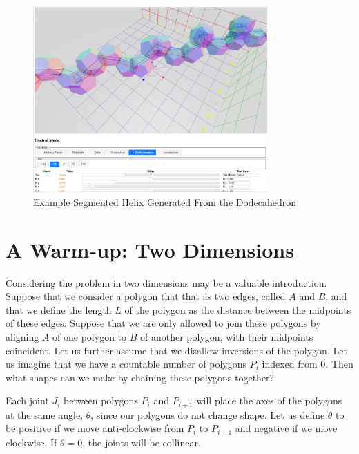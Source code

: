 \documentclass[11pt]{article}
\begin{document}
{\begin{figure}
     \centering
     \includegraphics[width=0.80\textwidth]{figures/Dodecahedral.png}
     \caption{Example Segmented Helix Generated From the Dodecahedron}
  \label{fig:dodecahedron}
\end{figure}


\section{A Warm-up: Two Dimensions}

Considering the problem in two dimensions may be a valuable introduction.
Suppose that we consider a polygon that that as two edges, called $A$ and $B$, and that we define the length $L$ of the
polygon as the distance between the midpoints of these edges. Suppose that we are only allowed to join these
polygons by aligning $A$ of one polygon to $B$ of another polygon, with their midpoints coincident. Let us
further assume that we disallow inversions of the polygon.  Let us imagine that we have a
countable number of polygons $P_i$ indexed from $0$. Then what shapes can we make by chaining these
polygons together?

Each joint $J_i$ between polygons $P_i$ and $P_{i+1}$ will place the axes of the polygons at the same angle, $\theta$, since
our polygons do not change shape. Let us define $\theta$ to be positive
if we move anti-clockwise from $P_i$ to $P_{i+1}$ and negative if we move clockwise.
If $\theta = 0$, the joints will be collinear.

}
\end{document}
